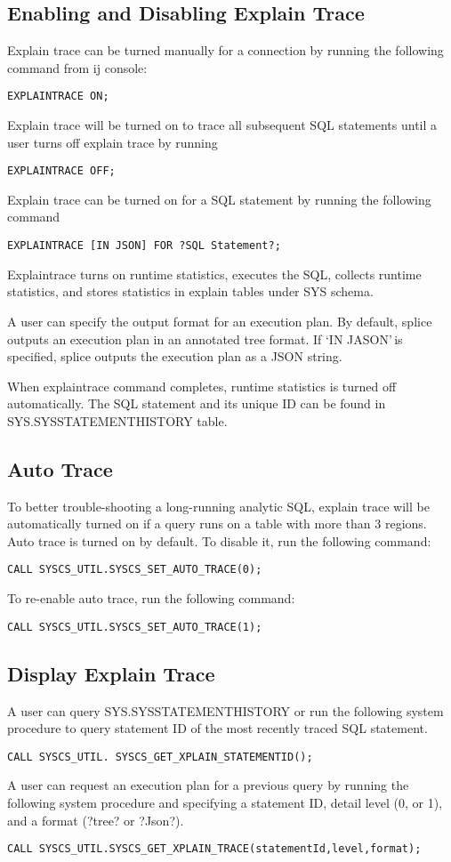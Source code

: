 \documentclass{article}
\begin{document}
\subsection{Enabling and Disabling Explain Trace}
Explain trace can be turned manually for a connection by running the following command from ij console:
\begin{lstlisting}
EXPLAINTRACE ON;
\end{lstlisting}
Explain trace will be turned on to trace all subsequent SQL statements until a user turns off explain trace by running 
\begin{lstlisting}
EXPLAINTRACE OFF;
\end{lstlisting}
Explain trace can be turned on for a SQL statement by running the following command
\begin{lstlisting}
EXPLAINTRACE [IN JSON] FOR ?SQL Statement?; 
\end{lstlisting}
Explaintrace turns on runtime statistics, executes the SQL, collects runtime statistics, and stores statistics in explain tables under SYS schema. 

\noindent
A user can specify the output format for an execution plan. By default, splice outputs an execution plan in an annotated tree format. If \lq IN JASON\rq\,is specified, splice outputs the execution plan as a JSON string.

\noindent
When explaintrace command completes, runtime statistics is turned off automatically. The SQL statement and its unique ID can be found in SYS.SYSSTATEMENTHISTORY table.  
\subsection{Auto Trace}
To better trouble-shooting a long-running analytic SQL, explain trace will be automatically turned on if a query runs on a table with more than 3 regions. Auto trace is turned on by default. To disable it, run the following command:

\begin{lstlisting}
CALL SYSCS_UTIL.SYSCS_SET_AUTO_TRACE(0);
\end{lstlisting}
\noindent
To re-enable auto trace, run the following command:
\begin{lstlisting}
CALL SYSCS_UTIL.SYSCS_SET_AUTO_TRACE(1);
\end{lstlisting}
\subsection{Display Explain Trace}
A user can query SYS.SYSSTATEMENTHISTORY or run the following system procedure to query statement ID of the most recently traced SQL statement.
\begin{lstlisting}
CALL SYSCS_UTIL. SYSCS_GET_XPLAIN_STATEMENTID();
\end{lstlisting}
A user can request an execution plan for a previous query by running the following system procedure and specifying a statement ID, detail level (0, or 1), and a format (?tree? or ?Json?).
\begin{lstlisting}
CALL SYSCS_UTIL.SYSCS_GET_XPLAIN_TRACE(statementId,level,format);
\end{lstlisting}
\end{document}
